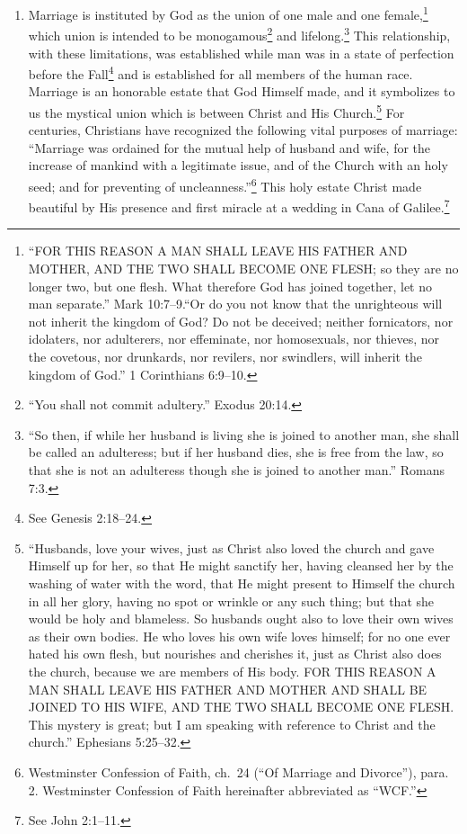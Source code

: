 \documentclass[
]{book}
\begin{document}
\begin{enumerate}
\item
  Marriage is instituted by God as the union of one male and one female,\footnote{``FOR THIS REASON A MAN SHALL LEAVE HIS FATHER AND MOTHER, AND THE TWO SHALL BECOME ONE FLESH; so they are no longer two, but one flesh. What therefore God has joined together, let no man separate.'' Mark 10:7--9.``Or do you not know that the unrighteous will not inherit the kingdom of God? Do not be deceived; neither fornicators, nor idolaters, nor adulterers, nor effeminate, nor homosexuals, nor thieves, nor the covetous, nor drunkards, nor revilers, nor swindlers, will inherit the kingdom of God.'' 1 Corinthians 6:9--10.} which union is intended to be monogamous\footnote{``You shall not commit adultery.'' Exodus 20:14.} and lifelong.\footnote{``So then, if while her husband is living she is joined to another man, she shall be called an adulteress; but if her husband dies, she is free from the law, so that she is not an adulteress though she is joined to another man.'' Romans 7:3.} This relationship, with these limitations, was established while man was in a state of perfection before the Fall\footnote{See Genesis 2:18--24.} and is established for all members of the human race. Marriage is an honorable estate that God Himself made, and it symbolizes to us the mystical union which is between Christ and His Church.\footnote{``Husbands, love your wives, just as Christ also loved the church and gave Himself up for her, so that He might sanctify her, having cleansed her by the washing of water with the word, that He might present to Himself the church in all her glory, having no spot or wrinkle or any such thing; but that she would be holy and blameless. So husbands ought also to love their own wives as their own bodies. He who loves his own wife loves himself; for no one ever hated his own flesh, but nourishes and cherishes it, just as Christ also does the church, because we are members of His body. FOR THIS REASON A MAN SHALL LEAVE HIS FATHER AND MOTHER AND SHALL BE JOINED TO HIS WIFE, AND THE TWO SHALL BECOME ONE FLESH. This mystery is great; but I am speaking with reference to Christ and the church.'' Ephesians 5:25--32.} For centuries, Christians have recognized the following vital purposes of marriage: ``Marriage was ordained for the mutual help of husband and wife, for the increase of mankind with a legitimate issue, and of the Church with an holy seed; and for preventing of uncleanness.''\footnote{Westminster Confession of Faith, ch.~24 (``Of Marriage and Divorce''), para. 2. Westminster Confession of Faith hereinafter abbreviated as ``WCF.''} This holy estate Christ made beautiful by His presence and first miracle at a wedding in Cana of Galilee.\footnote{See John 2:1--11.}
\end{enumerate}
\end{document}
